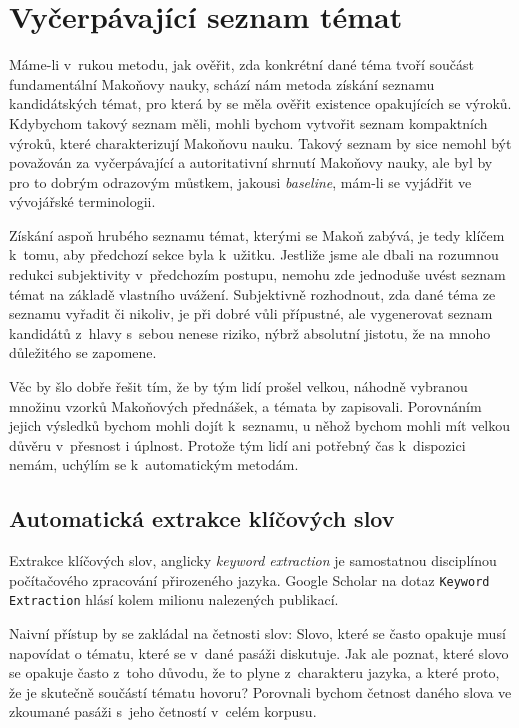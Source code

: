 \section{Vyčerpávající seznam témat}

Máme-li v~rukou metodu, jak ověřit, zda konkrétní dané téma tvoří součást
fundamentální Makoňovy nauky, schází nám metoda získání seznamu kandidátských
témat, pro která by se měla ověřit existence opakujících se výroků. Kdybychom
takový seznam měli, mohli bychom vytvořit seznam kompaktních výroků, které
charakterizují Makoňovu nauku. Takový seznam by sice nemohl být považován za
vyčerpávající a autoritativní shrnutí Makoňovy nauky, ale byl by pro to dobrým
odrazovým můstkem, jakousi \textit{baseline}, mám-li se vyjádřit ve vývojářské
terminologii.

Získání aspoň hrubého seznamu témat, kterými se Makoň zabývá, je tedy klíčem
k~tomu, aby předchozí sekce byla k~užitku. Jestliže jsme ale dbali na rozumnou
redukci subjektivity v~předchozím postupu, nemohu zde jednoduše uvést seznam
témat na základě vlastního uvážení. Subjektivně rozhodnout, zda dané téma ze
seznamu vyřadit či nikoliv, je při dobré vůli přípustné, ale vygenerovat seznam
kandidátů z~hlavy s~sebou nenese riziko, nýbrž absolutní jistotu, že na mnoho
důležitého se zapomene.

Věc by šlo dobře řešit tím, že by tým lidí prošel velkou, náhodně vybranou
množinu vzorků Makoňových přednášek, a témata by zapisovali. Porovnáním jejich
výsledků bychom mohli dojít k~seznamu, u něhož bychom mohli mít velkou důvěru
v~přesnost i úplnost. Protože tým lidí ani potřebný čas k~dispozici nemám,
uchýlím se k~automatickým metodám.

\subsection{Automatická extrakce klíčových slov}

Extrakce klíčových slov, anglicky \textit{keyword extraction} je samostatnou
disciplínou počítačového zpracování přirozeného jazyka. Google Scholar na dotaz
\texttt{Keyword Extraction} hlásí kolem milionu nalezených publikací.

Naivní přístup by se zakládal na četnosti slov: Slovo, které se často opakuje
musí napovídat o tématu, které se v~dané pasáži diskutuje. Jak ale poznat, které
slovo se opakuje často z~toho důvodu, že to plyne z~charakteru jazyka, a které
proto, že je skutečně součástí tématu hovoru? Porovnali bychom četnost daného
slova ve zkoumané pasáži s~jeho četností v~celém korpusu.

